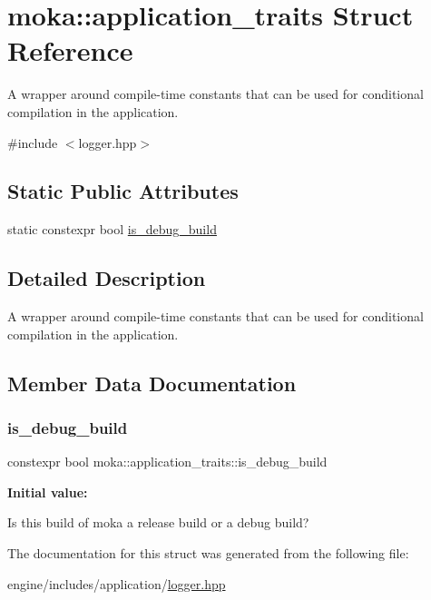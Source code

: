 \hypertarget{structmoka_1_1application__traits}{}\section{moka\+::application\+\_\+traits Struct Reference}
\label{structmoka_1_1application__traits}


A wrapper around compile-\/time constants that can be used for conditional compilation in the application.  




{\ttfamily \#include $<$logger.\+hpp$>$}

\subsection*{Static Public Attributes}
\begin{DoxyCompactItemize}
\item 
static constexpr bool \mbox{\hyperlink{structmoka_1_1application__traits_a3d66f66b2e315b455c26b70564ffc111}{is\+\_\+debug\+\_\+build}}
\end{DoxyCompactItemize}


\subsection{Detailed Description}
A wrapper around compile-\/time constants that can be used for conditional compilation in the application. 

\subsection{Member Data Documentation}
\mbox{\label{structmoka_1_1application__traits_a3d66f66b2e315b455c26b70564ffc111}} 
\subsubsection{\texorpdfstring{is\_debug\_build}{is\_debug\_build}}
{\footnotesize\ttfamily constexpr bool moka\+::application\+\_\+traits\+::is\+\_\+debug\+\_\+build\hspace{0.3cm}{\ttfamily [static]}}

{\bfseries Initial value\+:}
\begin{DoxyCode}{0}
\DoxyCodeLine{=}
\DoxyCodeLine{            \textcolor{keyword}{true}}

\end{DoxyCode}
Is this build of moka a release build or a debug build? 

The documentation for this struct was generated from the following file\+:\begin{DoxyCompactItemize}
\item 
engine/includes/application/\mbox{\hyperlink{logger_8hpp}{logger.\+hpp}}\end{DoxyCompactItemize}
